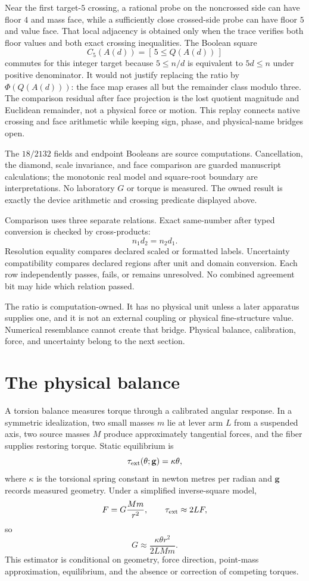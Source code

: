 Near the first target-\(5\) crossing, a rational probe on the noncrossed side can have floor \(4\) and mass face,
while a sufficiently close crossed-side probe can have floor \(5\) and value face.  That local adjacency is obtained
only when the trace verifies both floor values and both exact crossing inequalities.  The Boolean square
\[
 C_5(A(d))=[\,5\leq Q(A(d))\,]
\]
commutes for this integer target because \(5\leq n/d\) is equivalent to \(5d\leq n\) under positive denominator.
It would not justify replacing the ratio by \(\Phi(Q(A(d)))\): the face map erases all but the remainder class
modulo three.  The comparison residual after face projection is the lost quotient magnitude and Euclidean remainder,
not a physical force or motion.  This replay connects native crossing and face arithmetic while keeping sign, phase,
and physical-name bridges open.

The \(18/2132\) fields and endpoint Booleans are source computations.  Cancellation, the diamond, scale invariance,
and face comparison are guarded manuscript calculations; the monotonic real model and square-root boundary are
interpretations.  No laboratory \(G\) or torque is measured.  The owned result is exactly the device arithmetic and
crossing predicate displayed above.

Comparison uses three separate relations.  Exact same-number after typed conversion is checked by cross-products:
\[
                         n_1d_2=n_2d_1.
\]
Resolution equality compares declared scaled or formatted labels.  Uncertainty compatibility compares declared
regions after unit and domain conversion.  Each row independently passes, fails, or remains unresolved.  No combined
agreement bit may hide which relation passed.

The ratio is computation-owned.  It has no physical unit unless a later apparatus supplies one, and it is not an
external coupling or physical fine-structure value.  Numerical resemblance cannot create that bridge.  Physical
balance, calibration, force, and uncertainty belong to the next section.
\section{The physical balance}

A torsion balance measures torque through a calibrated angular response.  In a symmetric idealization, two small
masses \(m\) lie at lever arm \(L\) from a suspended axis, two source masses \(M\) produce approximately tangential
forces, and the fiber supplies restoring torque.  Static equilibrium is
\[
                         \tau_{\rm ext}(\theta;\mathbf g)=\kappa\theta,
\]
where \(\kappa\) is the torsional spring constant in newton metres per radian and \(\mathbf g\) records measured
geometry.  Under a simplified inverse-square model,
\[
                         F=G\frac{Mm}{r^2},\qquad
                         \tau_{\rm ext}\approx2LF,
\]
so
\[
                         G\approx\frac{\kappa\theta r^2}{2LMm}.
\]
This estimator is conditional on geometry, force direction, point-mass approximation, equilibrium, and the absence
or correction of competing torques.

